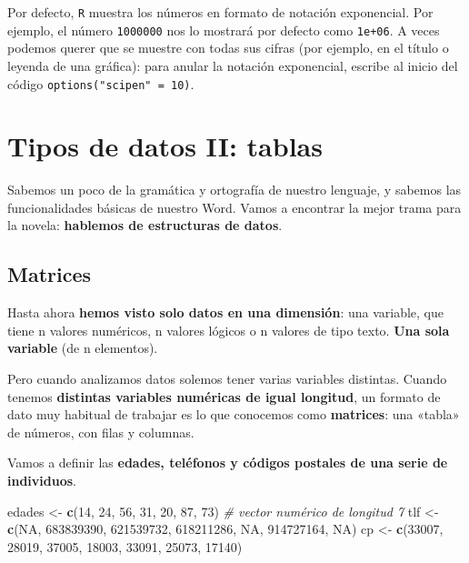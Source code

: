 \documentclass[11pt,]{book}
\newenvironment{Shaded}{\begin{snugshade}}{\end{snugshade}}
\newcommand{\CommentTok}[1]{\textcolor[rgb]{0.37,0.37,0.37}{\textit{#1}}}
\newcommand{\DecValTok}[1]{\textcolor[rgb]{0.06,0.06,0.06}{#1}}
\newcommand{\KeywordTok}[1]{\textcolor[rgb]{0.27,0.27,0.27}{\textbf{#1}}}
\newcommand{\NormalTok}[1]{#1}
\newcommand{\OtherTok}[1]{\textcolor[rgb]{0.37,0.37,0.37}{#1}}
\newcommand{\StringTok}[1]{\textcolor[rgb]{0.5,0.5,0.5}{#1}}
\begin{document}
Por defecto, \texttt{R} muestra los números en formato de notación exponencial. Por ejemplo, el número \texttt{1000000} nos lo mostrará por defecto como \texttt{1e+06}. A veces podemos querer que se muestre con todas sus cifras (por ejemplo, en el título o leyenda de una gráfica): para anular la notación exponencial, escribe al inicio del código \texttt{options("scipen"\ =\ 10)}.

\hypertarget{datos}{%
\chapter{Tipos de datos II: tablas}\label{datos}}

Sabemos un poco de la gramática y ortografía de nuestro lenguaje, y sabemos las funcionalidades básicas de nuestro Word. Vamos a encontrar la mejor trama para la novela: \textbf{hablemos de estructuras de datos}.

\hypertarget{matrices}{%
\section{Matrices}\label{matrices}}

Hasta ahora \textbf{hemos visto solo datos en una dimensión}: una variable, que tiene n valores numéricos, n valores lógicos o n valores de tipo texto. \textbf{Una sola variable} (de n elementos).

Pero cuando analizamos datos solemos tener varias variables distintas. Cuando tenemos \textbf{distintas variables numéricas de igual longitud}, un formato de dato muy habitual de trabajar es lo que conocemos como \textbf{matrices}: una «tabla» de números, con filas y columnas.

Vamos a definir las \textbf{edades, teléfonos y códigos postales de una serie de individuos}.

\begin{Shaded}
\begin{Highlighting}[]
\NormalTok{edades <-}\StringTok{ }\KeywordTok{c}\NormalTok{(}\DecValTok{14}\NormalTok{, }\DecValTok{24}\NormalTok{, }\DecValTok{56}\NormalTok{, }\DecValTok{31}\NormalTok{, }\DecValTok{20}\NormalTok{, }\DecValTok{87}\NormalTok{, }\DecValTok{73}\NormalTok{) }\CommentTok{# vector numérico de longitud 7}
\NormalTok{tlf <-}\StringTok{ }\KeywordTok{c}\NormalTok{(}\OtherTok{NA}\NormalTok{, }\DecValTok{683839390}\NormalTok{, }\DecValTok{621539732}\NormalTok{, }\DecValTok{618211286}\NormalTok{, }\OtherTok{NA}\NormalTok{, }\DecValTok{914727164}\NormalTok{, }\OtherTok{NA}\NormalTok{)}
\NormalTok{cp <-}\StringTok{ }\KeywordTok{c}\NormalTok{(}\DecValTok{33007}\NormalTok{, }\DecValTok{28019}\NormalTok{, }\DecValTok{37005}\NormalTok{, }\DecValTok{18003}\NormalTok{, }\DecValTok{33091}\NormalTok{, }\DecValTok{25073}\NormalTok{, }\DecValTok{17140}\NormalTok{)}
\end{Highlighting}
\end{Shaded}
\end{document}
